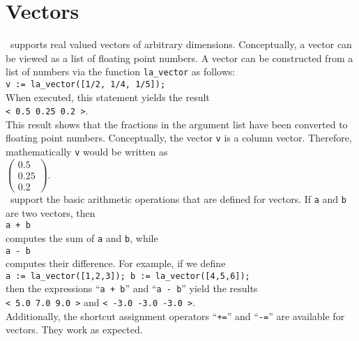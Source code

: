 \section{Vectors}
\setlx\ supports real valued vectors of arbitrary dimensions.  Conceptually, a vector can be viewed as
a list of floating point numbers.  A vector can be constructed from a list of numbers via the
function \texttt{la\_vector} as follows:
\\[0.2cm]
\hspace*{1.3cm}
\texttt{v := la\_vector([1/2, 1/4, 1/5]);}
\\[0.2cm]
When executed, this statement yields the result
\\[0.2cm]
\hspace*{1.3cm}
\texttt{< 0.5  0.25  0.2 >}.
\\[0.2cm]
This result shows that the fractions in the argument list have been converted to floating point
numbers.  Conceptually, the vector \texttt{v} is a column vector.  Therefore, mathematically
\texttt{v} would be written as
\\[0.2cm]
\hspace*{1.3cm}
$
\left(\begin{array}{l}
  0.5  \\
  0.25 \\
  0.2
\end{array}\right)
$.
\\[0.2cm]
\setlx\ support the basic arithmetic operations that are defined for vectors.  If \texttt{a} and
\texttt{b} are two vectors, then 
\\[0.2cm]
\hspace*{1.3cm}
\texttt{a + b}
\\[0.2cm]
computes the sum of \texttt{a} and \texttt{b}, while 
\\[0.2cm]
\hspace*{1.3cm}
\texttt{a - b}
\\[0.2cm]
computes their difference.  For example, if we define
\\[0.2cm]
\hspace*{1.3cm}
\texttt{a := la\_vector([1,2,3]);   b := la\_vector([4,5,6]);}
\\[0.2cm]
then the expressions ``\texttt{a + b}'' and ``\texttt{a - b}'' yield the results
\\[0.2cm]
\hspace*{1.3cm}
\texttt{< 5.0  7.0  9.0 >} \quad and \quad \texttt{< -3.0  -3.0  -3.0 >}.
\\[0.2cm]
Additionally, the shortcut assignment operators ``\texttt{+=}'' and ``\texttt{-=}'' are available
for vectors.  They work as expected.

